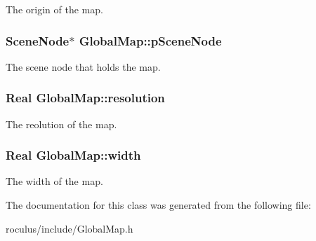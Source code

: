 \-The origin of the map. \hypertarget{classGlobalMap_a3ef2cbe2c69a7257fbf17ef338e679c1}{
\subsubsection[{p\-Scene\-Node}]{\setlength{\rightskip}{0pt plus 5cm}\-Scene\-Node$\ast$ {\bf \-Global\-Map\-::p\-Scene\-Node}}}\label{classGlobalMap_a3ef2cbe2c69a7257fbf17ef338e679c1}
\-The scene node that holds the map. \hypertarget{classGlobalMap_a0bfaceb4b03dd0c79179f627565d3a8a}{
\subsubsection[{resolution}]{\setlength{\rightskip}{0pt plus 5cm}\-Real {\bf \-Global\-Map\-::resolution}}}\label{classGlobalMap_a0bfaceb4b03dd0c79179f627565d3a8a}
\-The reolution of the map. \hypertarget{classGlobalMap_adbd369e87c136942c600d7675595ebd7}{
\subsubsection[{width}]{\setlength{\rightskip}{0pt plus 5cm}\-Real {\bf \-Global\-Map\-::width}}}\label{classGlobalMap_adbd369e87c136942c600d7675595ebd7}
\-The width of the map. 

\-The documentation for this class was generated from the following file\-:\begin{DoxyCompactItemize}
\item 
roculus/include/\-Global\-Map.\-h\end{DoxyCompactItemize}
